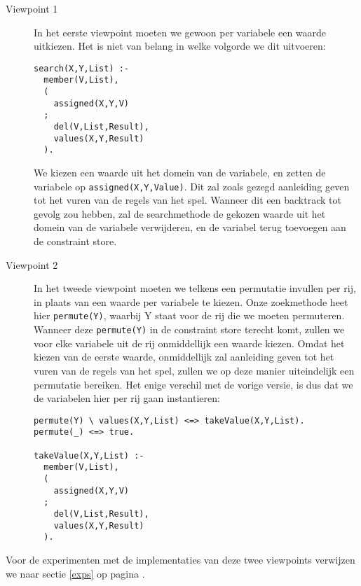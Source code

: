 \begin{description}
 \item[Viewpoint 1] In het eerste viewpoint moeten we gewoon per variabele een waarde uitkiezen.
        Het is niet van belang in welke volgorde we dit uitvoeren:
\begin{verbatim}
search(X,Y,List) :-
  member(V,List),
  (
    assigned(X,Y,V)
  ;
    del(V,List,Result),
    values(X,Y,Result)
  ).
\end{verbatim}
        We kiezen een waarde uit het domein van de variabele, en zetten de variabele op \verb|assigned(X,Y,Value)|.
        Dit zal zoals gezegd aanleiding geven tot het vuren van de regels van het spel. Wanneer dit een backtrack
        tot gevolg zou hebben, zal de searchmethode de gekozen waarde uit het domein van de variabele verwijderen,
        en de variabel terug toevoegen aan de constraint store.
 \item[Viewpoint 2]
        In het tweede viewpoint moeten we telkens een permutatie invullen per rij, in plaats van een waarde
        per variabele te kiezen. Onze zoekmethode heet hier \verb|permute(Y)|, waarbij Y staat voor de rij
        die we moeten permuteren. Wanneer deze \verb|permute(Y)| in de constraint store terecht komt,
        zullen we voor elke variabele uit de rij onmiddellijk een waarde kiezen. Omdat het kiezen van de
        eerste waarde, onmiddellijk zal aanleiding geven tot het vuren van de regels van het spel, zullen
        we op deze manier uiteindelijk een permutatie bereiken. Het enige verschil met de vorige versie, is
        dus dat we de variabelen hier per rij gaan instantieren:
\begin{verbatim}
permute(Y) \ values(X,Y,List) <=> takeValue(X,Y,List).
permute(_) <=> true.

takeValue(X,Y,List) :-
  member(V,List),
  (
    assigned(X,Y,V)
  ;
    del(V,List,Result),
    values(X,Y,Result)
  ).
\end{verbatim}
\end{description}
Voor de experimenten met de implementaties van deze twee viewpoints verwijzen we 
naar sectie \ref{exps} op pagina \pageref{exps}.

